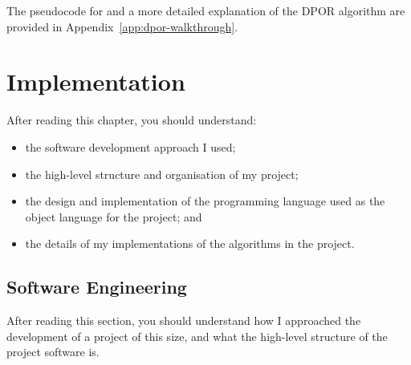 \documentclass[12pt,a4paper,twoside,openright]{report}
\newcommand{\Let}[2]{\State \textbf{let} #1 = #2 \textbf{in}}
\newenvironment{understandinglist}
	{\begin{itemize} \itemsep 0em}{\end{itemize}}
\begin{document}
The pseudocode for and a more
detailed explanation of the DPOR
algorithm are provided in
Appendix~\ref{app:dpor-walkthrough}.

\newcommand{\dporpseudocode}{
	\begin{algorithmic}[1]
		\Procedure{Explore}{$\pi$}
		\Let{$\sigma$}{$\textit{last}(\pi)$}
		\ForAll{$p \in \mathcal{P}$}
		\State \Call{UpdateBacktrackSets}
		{$\pi,\, \textit{next}(\sigma, p)$}
		\EndFor
		\If{$\textit{enabled}(\sigma) \neq \emptyset$}
		\Let{$t$}{any $t \in \textit{enabled}(\sigma)$}
		\Let{$\textit{backtrack}(\sigma)$}{$\{t\}$}
		\Let{$\textit{done}(\sigma)$}{$\emptyset$}
		\While{$\textit{done}(\sigma)
			 \neq \textit{backtrack}(\sigma)$}
		\Let{$t$}{any $t \in (\textit{backtrack}(\sigma)
			\setminus \textit{done}(\sigma))$}
		\State add $t$ to $\textit{done}(\sigma);$
		\State \Call{Explore}{$\pi.t$}

		\EndWhile
		\EndIf
		\EndProcedure
		\State
		\Procedure{UpdateBacktrackSets}{$\pi,\, t_{p,s}$}
		\Let{$D$}{$\{i \in \textit{dom}(\pi) \mid
			\pi_i \text{ is dependent with } t_{p,s}
			\text{ and } i \not \hookrightarrow_\pi p\}$}
		\If{$D \neq \emptyset$}
		\Let{$\sigma_d$}
		{$\textit{pre}(\pi,\text{max}(D))$}
		\If{$\textit{next}(\sigma_d, p)
			\in \textit{enabled}(\sigma_d)$}
		add $\textit{next}(\sigma_d, p)$
		to $\textit{backtrack}(\sigma_d)$
		\Else {
			add all of $\textit{enabled}(\sigma_d)$
			to $\textit{backtrack}(\sigma_d)$
		} \EndIf
		\EndIf
		\EndProcedure
		\State
		\State Initially: \Call{Explore}{$\emptyset$}
	\end{algorithmic}
}

\chapter{Implementation}
\label{cha:imp}
After reading this chapter,
you should understand:
\begin{understandinglist}
	\item the software development approach
	I used;
	\item the high-level structure and
	organisation of my project;
	\item the design and implementation of
	the programming language used
	as the object language for the
	project; and
	\item the details of my
	implementations of the
	algorithms in the project.
\end{understandinglist}


\section{Software Engineering}
After reading this section, you should
understand how I approached the
development of a project of this
size, and what the high-level
structure of the project software is.
\end{document}
